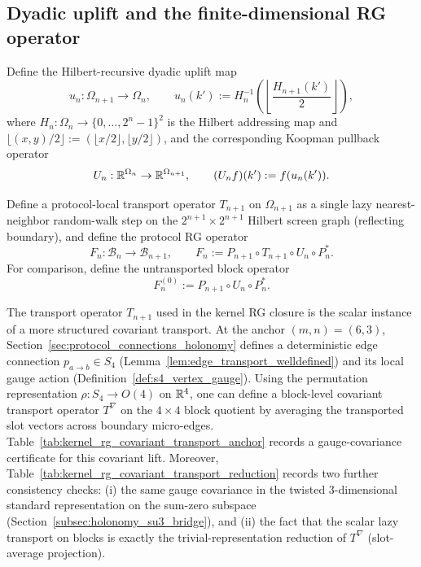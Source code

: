 \subsection{Dyadic uplift and the finite-dimensional RG operator}
\label{subsec:rg_operator_uplift}

\begin{definition}\label{def:dyadic_uplift_koopman_appendix}
\MathTag Define the Hilbert-recursive dyadic uplift map
\[
u_n:\Omega_{n+1}\to\Omega_n,
\qquad
u_n(k'):=H_n^{-1}\!\left(\left\lfloor \frac{H_{n+1}(k')}{2}\right\rfloor\right),
\]
where $H_n:\Omega_n\to \{0,\dots,2^n-1\}^2$ is the Hilbert addressing map and
$\lfloor(x,y)/2\rfloor:=(\lfloor x/2\rfloor,\lfloor y/2\rfloor)$,
and the corresponding Koopman pullback operator
\[
U_n:\mathbb{R}^{\Omega_n}\to\mathbb{R}^{\Omega_{n+1}},
\qquad
(U_nf)(k'):=f(u_n(k')).
\]
\end{definition}

\begin{definition}\label{def:protocol_rg_operator_appendix}
\MathTag Define a protocol-local transport operator $T_{n+1}$ on $\Omega_{n+1}$ as a single lazy nearest-neighbor random-walk step on the $2^{n+1}\times 2^{n+1}$ Hilbert screen graph (reflecting boundary), and define the protocol RG operator
\[
F_n:\mathcal{B}_n\to\mathcal{B}_{n+1},
\qquad
F_n:=P_{n+1}\circ T_{n+1}\circ U_n\circ P_n^\ast.
\]
\AuditTag For comparison, define the untransported block operator
\[
F_n^{(0)}:=P_{n+1}\circ U_n\circ P_n^\ast.
\]
\end{definition}

\begin{remark}\label{rem:rg_covariant_transport_lift}
\AuditTag The transport operator $T_{n+1}$ used in the kernel RG closure is the scalar instance of a more structured covariant transport.
At the anchor $(m,n)=(6,3)$, Section~\ref{sec:protocol_connections_holonomy} defines a deterministic edge connection $p_{a\to b}\in S_4$ (Lemma~\ref{lem:edge_transport_welldefined}) and its local gauge action (Definition~\ref{def:s4_vertex_gauge}).
Using the permutation representation $\rho:S_4\to O(4)$ on $\mathbb{R}^4$, one can define a block-level covariant transport operator $T^\nabla$ on the $4\times4$ block quotient by averaging the transported slot vectors across boundary micro-edges.
Table~\ref{tab:kernel_rg_covariant_transport_anchor} records a gauge-covariance certificate for this covariant lift.
Moreover, Table~\ref{tab:kernel_rg_covariant_transport_reduction} records two further consistency checks:
(i) the same gauge covariance in the twisted $3$-dimensional standard representation on the sum-zero subspace (Section~\ref{subsec:holonomy_su3_bridge}),
and (ii) the fact that the scalar lazy transport on blocks is exactly the trivial-representation reduction of $T^\nabla$ (slot-average projection).
\end{remark}

